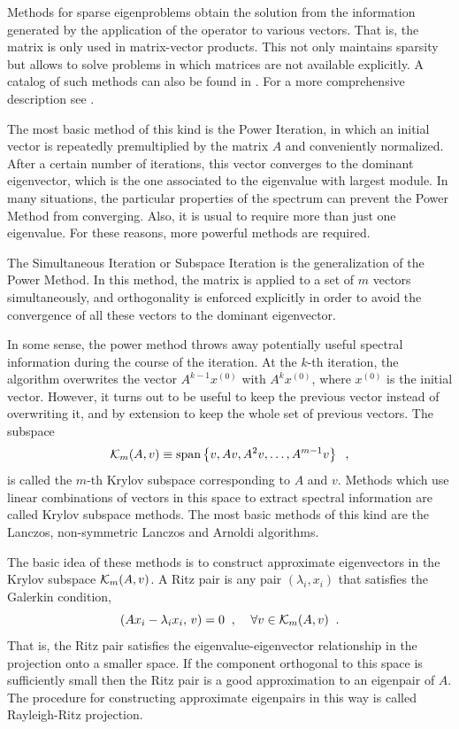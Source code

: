 	Methods for sparse eigenproblems obtain the solution from the information generated by the application of the operator to various vectors. That is, the matrix is only used in matrix-vector products. This not only maintains sparsity but allows to solve problems in which matrices are not available explicitly. A catalog of such methods can also be found in \citep{Golub:2000:EC2}. For a more comprehensive description see \citep{Bai:2000:TSA}.

	The most basic method of this kind is the Power Iteration, in which an initial vector is repeatedly premultiplied by the matrix $A$ and conveniently normalized. After a certain number of iterations, this vector converges to the dominant eigenvector, which is the one associated to the eigenvalue with largest module. In many situations, the particular properties of the spectrum can prevent the Power Method from converging. Also, it is usual to require more than just one eigenvalue. For these reasons, more powerful methods are required.

	The Simultaneous Iteration or Subspace Iteration is the generalization of the Power Method. In this method, the matrix is applied to a set of $m$ vectors simultaneously, and orthogonality is enforced explicitly in order to avoid the convergence of all these vectors to the dominant eigenvector.

	In some sense, the power method throws away potentially useful spectral information during the course of the iteration. At the $k$-th iteration, the algorithm overwrites the vector $A^{k-1}x^{(0)}$ with $A^kx^{(0)}$, where $x^{(0)}$ is the initial vector. However, it turns out to be useful to keep the previous vector instead of overwriting it, and by extension to keep the whole set of previous vectors. The subspace
\begin{equation}
\mathcal{K}_m(A,v)\equiv\mathrm{span}\left\{v,Av,A^2v,\ldots,A^{m-1}v\right\}\;\;,
\label{eq:krylov}
\end{equation}
is called the $m$-th Krylov subspace corresponding to $A$ and $v$. Methods which use linear combinations of vectors in this space to extract spectral information are called Krylov subspace methods. The most basic methods of this kind are the Lanczos, non-symmetric Lanczos and Arnoldi algorithms.

	The basic idea of these methods is to construct approximate eigenvectors in the Krylov subspace $\mathcal{K}_m(A,v)$. A Ritz pair is any pair $(\lambda_i,x_i)$ that satisfies the Galerkin condition,
\begin{equation}
\label{eq:galerkin}
(Ax_i-\lambda_i x_i,\,v)=0\;\;,\;\;\;\;\forall v\in\mathcal{K}_m(A,v)\;\;.
\end{equation}
That is, the Ritz pair satisfies the eigenvalue-eigenvector relationship in the projection onto a smaller space. If the component orthogonal to this space is sufficiently small then the Ritz pair is a good approximation to an eigenpair of $A$. The procedure for constructing approximate eigenpairs in this way is called Rayleigh-Ritz projection.

